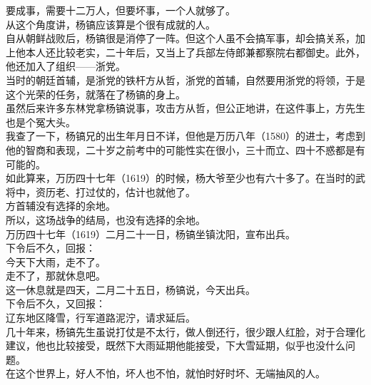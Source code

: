 \begin{multicols}{\theparacolNo}
要成事，需要十二万人，但要坏事，一个人就够了。\\

从这个角度讲，杨镐应该算是个很有成就的人。\\

自从朝鲜战败后，杨镐很是消停了一阵。但这个人虽不会搞军事，却会搞关系，加上他本人还比较老实，二十年后，又当上了兵部左侍郎兼都察院右都御史。此外，他还加入了组织——浙党。\\

当时的朝廷首辅，是浙党的铁杆方从哲，浙党的首辅，自然要用浙党的将领，于是这个光荣的任务，就落在了杨镐的身上。\\

虽然后来许多东林党拿杨镐说事，攻击方从哲，但公正地讲，在这件事上，方先生也是个冤大头。\\

我查了一下，杨镐兄的出生年月日不详，但他是万历八年（1580）的进士，考虑到他的智商和表现，二十岁之前考中的可能性实在很小，三十而立、四十不惑都是有可能的。\\

如此算来，万历四十七年（1619）的时候，杨大爷至少也有六十多了。在当时的武将中，资历老、打过仗的，估计也就他了。\\

方首辅没有选择的余地。\\

所以，这场战争的结局，也没有选择的余地。\\

万历四十七年（1619）二月二十一日，杨镐坐镇沈阳，宣布出兵。\\

下令后不久，回报：\\

今天下大雨，走不了。\\

走不了，那就休息吧。\\

这一休息就是四天，二月二十五日，杨镐说，今天出兵。\\

下令后不久，又回报：\\

辽东地区降雪，行军道路泥泞，请求延后。\\

几十年来，杨镐先生虽说打仗是不太行，做人倒还行，很少跟人红脸，对于合理化建议，他也比较接受，既然下大雨延期他能接受，下大雪延期，似乎也没什么问题。\\

在这个世界上，好人不怕，坏人也不怕，就怕时好时坏、无端抽风的人。\\


\end{multicols}
